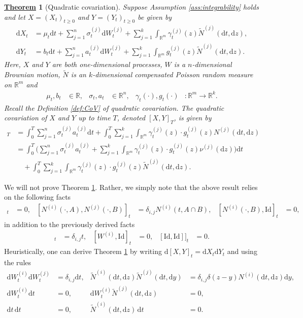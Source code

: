 \documentclass[12pt]{book}
\numberwithin{equation}{chapter}
\theoremstyle{plain}
\newtheorem{theorem}{\underline{Theorem}}
\numberwithin{theorem}{section}
\theoremstyle{definition}
\numberwithin{exercise}{chapter}
\newcommand{\<}{\langle}
\renewcommand{\>}{\rangle}
\renewcommand{\(}{\left(}
\renewcommand{\)}{\right)}
\renewcommand{\[}{\left[}
\renewcommand{\]}{\right]}
\newcommand\Rb{\mathds{R}}
\newcommand\sig{\sigma}
\newcommand\gam{\gamma}
\newcommand\del{\delta}
\newcommand\Nt{\widetilde{N}}
\newcommand\dd{\mathrm{d}}
\newcommand\Id{\text{Id}}
\begin{document}
\begin{theorem}[Quadratic covariation]
\label{thm:covar}
Suppose Assumption \ref{ass:integrability} holds and let $X = (X_t)_{t \geq 0}$ and $Y = (Y_t)_{t \geq 0}$ be given by
\begin{align}
\dd X_t
	&=	\mu_t \dd t + \sum_{j=1}^n \sig_t^{(j)} \dd W_t^{(j)} + \sum_{j=1}^k \int_{\Rb^m} \gam_t^{(j)}(z) \Nt^{(j)}( \dd t , \dd z ) , \label{eq:dX.QV} \\
\dd Y_t
	&=	b_t \dd t + \sum_{j=1}^n a_t^{(j)} \dd W_t^{(j)} + \sum_{j=1}^k \int_{\Rb^m} g_t^{(j)}(z) \Nt^{(j)}( \dd t , \dd z ) .
\end{align}
Here, $X$ and $Y$ are both one-dimensional processes, $W$ is a $n$-dimensional Brownian motion, $\Nt$ is an $k$-dimensional compensated Poisson random measure on $\Rb^m$ and
\begin{align}
\mu_t, b_t
	& \in \Rb , &
\sig_t, a_t
	&\in \Rb^n , &
\gam_t(\cdot), g_t(\cdot)
	&: \Rb^m \to \Rb^k .
\end{align}
Recall the Definition \ref{def:CoV} of quadratic covariation.
The {quadratic covariation} of $X$ and $Y$ up to time $T$, denoted $[X,Y]_T$, is given by
\begin{align}
[X,Y]_T
	&=	\int_0^T \sum_{j=1}^n \sig_t^{(j)} a_t^{(j)} \dd t + \int_0^T \sum_{j=1}^k \int_{\Rb^m} \gam_t^{(j)}(z) \cdot g_t^{(j)}(z) N^{(j)}(\dd t, \dd z) \\
	&=	\int_0^T \Big( \sum_{j=1}^n \sig_t^{(j)} a_t^{(j)} + \sum_{j=1}^k \int_{\Rb^m} \gam_t^{(j)}(z) \cdot g_t^{(j)}(z) \nu^{(j)}(\dd z) \Big) \dd t \\ &\quad
			+ \int_0^T \sum_{j=1}^k \int_{\Rb^m} \gam_t^{(j)}(z) \cdot g_t^{(j)}(z) \Nt^{(j)}(\dd t, \dd z) .
\end{align}
\end{theorem}

\noindent
We will not prove Theorem \ref{thm:covar}. Rather, we simply note that the above result relies on the following facts
\begin{align}
[W^{(i)}, N^{(j)}( \cdot, A ) ]_t
	&=	0 , &
[N^{(i)}(\cdot, A), N^{(j)}(\cdot, B)]_t
	&=	\del_{i,j} N^{(i)}(t, A \cap B) , &
[ N^{(i)}(\cdot, B),\Id]_t
	&=	0 ,
\end{align}
in addition to the previously derived facts 
\begin{align}
[W^{(i)},W^{(j)}]_t 
	&= \del_{i,j} t, &
[W^{(i)}, \Id]_t 
	&= 0 , &
[\Id,\Id]]_t 
	&= 0 .
\end{align}
Heuristically, one can derive Theorem \ref{thm:covar} by writing $\dd[X,Y]_t = \dd X_t \dd Y_t$ and using the rules
\begin{align}
\dd W_t^{(i)} \dd W_t^{(j)}
	&=	\del_{i,j} \dd t , &
\Nt^{(i)}(\dd t, \dd z) \Nt^{(j)}(\dd t, \dd y)
	&=	\del_{i,j} \del(z-y) N^{(i)}(\dd t, \dd z) \dd y, \\
\dd W_t^{(i)} \dd t
	&=	0 , &
\dd W_t^{(i)} \Nt^{(j)}(\dd t, \dd z)
	&=	0  , \\
\dd t \, \dd t
	&=	0 , &
\Nt^{(i)}(\dd t, \dd z) \, \dd t
	&=	0.
\end{align}
\end{document}
